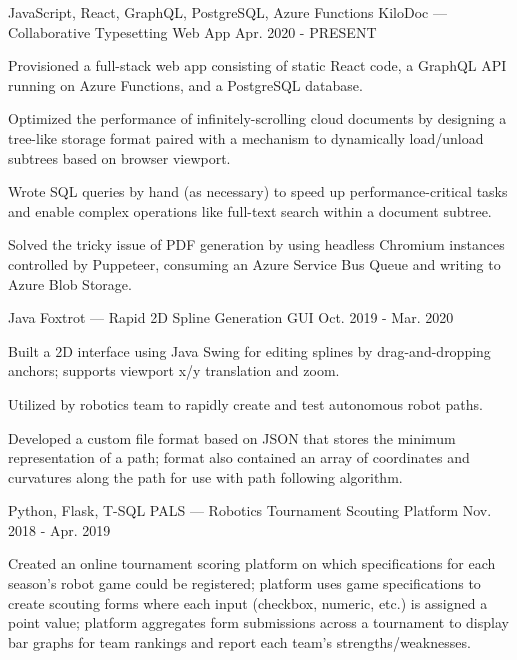
\begin{cventries}
  \cventry
  {JavaScript, React, GraphQL, PostgreSQL, Azure Functions} %
  {KiloDoc --- Collaborative Typesetting Web App} %
  {} %
  {Apr. 2020 - PRESENT} %
  {
    \begin{cvitems} %
      \item {Provisioned a full-stack web app consisting of static React code, a GraphQL API running on Azure Functions, and a PostgreSQL database.}
      \item {Optimized the performance of infinitely-scrolling cloud documents by designing a tree-like storage format paired with a mechanism to dynamically load/unload subtrees based on browser viewport.}
      \item {Wrote SQL queries by hand (as necessary) to speed up performance-critical tasks and enable complex operations like full-text search within a document subtree.}
      \item {Solved the tricky issue of PDF generation by using headless Chromium instances controlled by Puppeteer, consuming an Azure Service Bus Queue and writing to Azure Blob Storage.}
    \end{cvitems}
  }

  \cventry
  {Java} %
  {Foxtrot --- Rapid 2D Spline Generation GUI} %
  {} %
  {Oct. 2019 - Mar. 2020} %
  {
    \begin{cvitems} %
      \item {Built a 2D interface using Java Swing for editing splines by drag-and-dropping anchors; supports viewport x/y translation and zoom.}
      \item {Utilized by robotics team to rapidly create and test autonomous robot paths.}
      \item {Developed a custom file format based on JSON that stores the minimum representation of a path; format also contained an array of coordinates and curvatures along the path for use with path following algorithm.}
    \end{cvitems}
  }

  \cventry
  {Python, Flask, T-SQL} %
  {PALS --- Robotics Tournament Scouting Platform} %
  {} %
  {Nov. 2018 - Apr. 2019} %
  {
    \begin{cvitems} %
      \item {Created an online tournament scoring platform on which specifications for each season's robot game could be registered; platform uses game specifications to create scouting forms where each input (checkbox, numeric, etc.) is assigned a point value; platform aggregates form submissions across a tournament to display bar graphs for team rankings and report each team's strengths/weaknesses.}
    \end{cvitems}
  }
\end{cventries}
